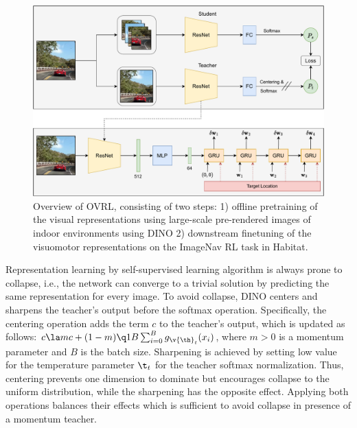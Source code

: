 \documentclass[letterpaper, 12pt]{book}
\theoremstyle{definition}
\theoremstyle{definition}
\theoremstyle{definition}
\theoremstyle{definition}
\theoremstyle{definition}
\newcommand{\vth}{\v{\th}}
\begin{document}
\begin{figure}[htbp]
\centering
\includegraphics[keepaspectratio,width=\textwidth,height=\textheight]{./img/ovrl.pdf}
\caption{\label{fig:org8bc161e}Overview of OVRL, consisting of two steps: 1) offline pretraining of the visual representations using large-scale pre-rendered images of indoor environments using DINO 2) downstream finetuning of the visuomotor representations on the ImageNav RL task in Habitat.}
\end{figure}


Representation learning by self-supervised learning algorithm is always prone to
collapse, i.e., the network can converge to a trivial solution by predicting the
same representation for every image. To avoid collapse, DINO centers and
sharpens the teacher’s output before the softmax operation. Specifically, the
centering operation adds the term \(c\) to the teacher’s output, which is
updated as follows: \(c\la mc+(1-m)\q1B\sum_{i=0}^{B}g_{\vth_{t}}(x_{i})\),
where \(m>0\) is a momentum parameter and \(B\) is the batch size. Sharpening is
achieved by setting low value for the temperature parameter \(\t_{t}\) for the
teacher softmax normalization. Thus, centering prevents one dimension to
dominate but encourages collapse to the uniform distribution, while the
sharpening has the opposite effect. Applying both operations balances their
effects which is sufficient to avoid collapse in presence of a momentum teacher.
\end{document}
